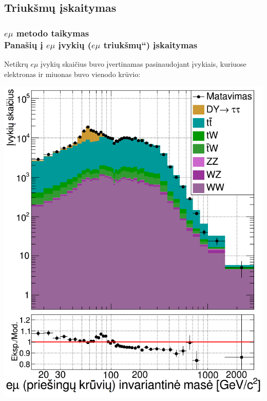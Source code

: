 \documentclass[xcolor=dvipsnames]{beamer}
\newcommand{\ltq}[1]{{\quotedblbase{}#1\textquotedblleft{}}}
\newcommand{\emu}{\mathit{e}\mu}
\begin{document}
\begin{frame}
	\section{Triukšmų įskaitymas}
	\frametitle{$\emu$ metodo taikymas\\ \normalsize Panašių į $\emu$ įvykių (\ltq{$\emu$ triukšmų}) įskaitymas}
	Netikrų $\emu$ įvykių skaičius buvo įvertinamas pasinaudojant įvykiais, kuriuose elektronas ir miuonas buvo vienodo krūvio:
	\begin{minipage}{0.44\textwidth}
		\includegraphics[width=\linewidth]{emuMassOS_SMALL.png}
	\end{minipage}
	\hfill
	\begin{minipage}{0.44\textwidth}

\end{minipage}
\end{frame}
\end{document}

